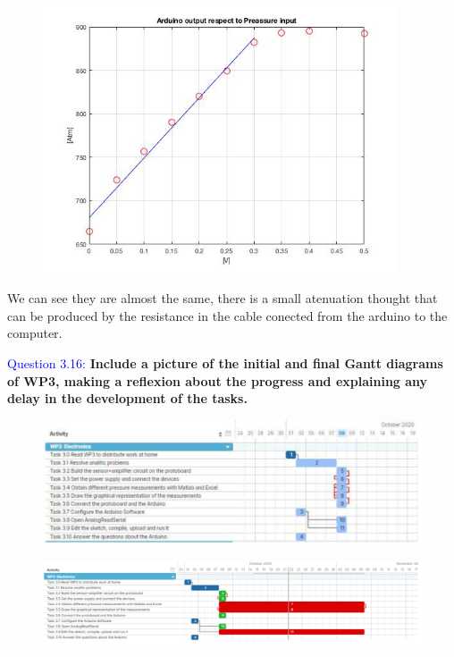 \documentclass[12pt, a4papre]{article}
\begin{document}
	\begin{figure}[H]
		\begin{center}
		\includegraphics[width=105mm]{MatlabGraph3.jpg}
		\end{center}
	\end{figure}
	
	We can see they are almost the same, there is a small atenuation thought that can be produced by the resistance in the cable conected from the arduino to the computer.

	\textcolor{blue}{Question 3.16:} \textbf{Include a picture of the initial and final Gantt diagrams of WP3, making a reflexion about the progress and explaining any delay in the development of the tasks. }
	
	\begin{figure}[H]
		\begin{center}
		\includegraphics[width=135mm]{WP3_ini}
		\end{center}
	\end{figure}
	\begin{figure}[H]
		\begin{center}
		\includegraphics[width=135mm]{WP3_fin}
		\end{center}
	\end{figure}
	
\end{document}
